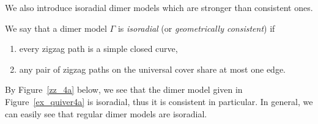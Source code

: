 \documentclass[ALCO,ThmDefs,Unicode]{cedram}
\begin{document}
We also introduce isoradial dimer models which are stronger than consistent ones.

\begin{defi}\label{def_isoradial}
We say that a dimer model $\Gamma$ is \emph{isoradial} (or \emph{geometrically consistent}) if
\begin{enumerate}[\rm(1)]
\item every zigzag path is a simple closed curve,
\item any pair of zigzag paths on the universal cover share at most one edge.
\end{enumerate}
\end{defi}

By Figure~\ref{zz_4a} below, we see that the dimer model given in Figure~\ref{ex_quiver4a} is isoradial, thus it is consistent in particular. In general, we can easily see that regular dimer models are isoradial.

\end{document}
